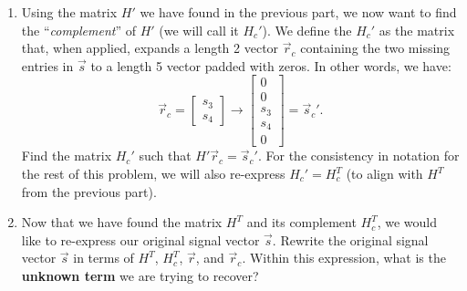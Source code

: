 \begin{enumerate}
\begin{enumerate}
    \item Using the matrix $H'$ we have found in the previous part, we now want to find the ``\textit{complement}'' of $H'$ (we will call it $H_c'$). We define the $H_c'$ as the matrix that, when applied, expands a length 2 vector $\vec{r}_c$ containing the two missing entries in $\vec{s}$ to a length 5 vector padded with zeros. In other words, we have:
     $$\vec{r}_c = \begin{bmatrix}
    s_3 \\
    s_4
    \end{bmatrix} \longrightarrow \begin{bmatrix}
    0 \\
    0 \\
    s_3 \\
    s_4 \\
    0
    \end{bmatrix} = \vec{s}_c'.$$
    Find the matrix $H_c'$ such that $H'\vec{r}_c = \vec{s}_c'.$ For the consistency in notation for the rest of this problem, we will also re-express $H_c' = H_c^T$ (to align with $H^T$ from the previous part).
    
    
    \item Now that we have found the matrix $H^T$ and its complement $H_c^T$, we would like to re-express our original signal vector $\vec{s}$. Rewrite the original signal vector $\vec{s}$ in terms of $H^T$, $H_c^T$, $\vec{r}$, and $\vec{r}_c$. Within this expression, what is the \textbf{unknown term} we are trying to recover?
    
    

\end{enumerate}
\end{enumerate}

